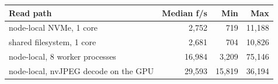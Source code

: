 \begin{tabular}{lrrr}
\toprule
Read path & Median f/s & Min & Max \\
\midrule
node-local NVMe, 1 core & 2,752 & 719 & 11,188 \\
shared filesystem, 1 core & 2,681 & 704 & 10,826 \\
node-local, 8 worker processes & 16,984 & 3,209 & 75,146 \\
node-local, nvJPEG decode on the GPU & 29,593 & 15,819 & 36,194 \\
\bottomrule
\end{tabular}
